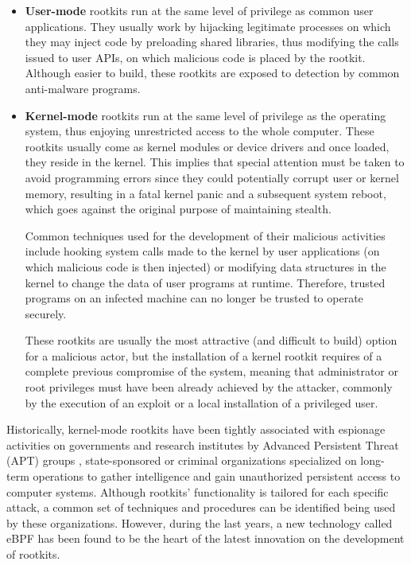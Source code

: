 \begin{itemize}
\item \textbf{User-mode} rootkits run at the same level of privilege as common user applications. They usually work by hijacking legitimate processes on which they may inject code by preloading shared libraries, thus modifying the calls issued to user APIs, on which malicious code is placed by the rootkit. Although easier to build, these rootkits are exposed to detection by common anti-malware programs.
\item \textbf{Kernel-mode} rootkits run at the same level of privilege as the operating system, thus enjoying unrestricted access to the whole computer. These rootkits usually come as kernel modules or device drivers and once loaded, they reside in the kernel. This implies that special attention must be taken to avoid programming errors since they could potentially corrupt user or kernel memory, resulting in a fatal kernel panic and a subsequent system reboot, which goes against the original purpose of maintaining stealth.

Common techniques used for the development of their malicious activities include hooking system calls made to the kernel by user applications (on which malicious code is then injected) or modifying data structures in the kernel to change the data of user programs at runtime. Therefore, trusted programs on an infected machine can no longer be trusted to operate securely.

These rootkits are usually the most attractive (and difficult to build) option for a malicious actor, but the installation of a kernel rootkit requires of a complete previous compromise of the system, meaning that administrator or root privileges must have been already achieved by the attacker, commonly by the execution of an exploit or a local installation of a privileged user.
\end{itemize}

Historically, kernel-mode rootkits have been tightly associated with espionage activities on governments and research institutes by Advanced Persistent Threat (APT) groups \cite{rootkit_ptsecurity}, state-sponsored or criminal organizations specialized on long-term operations to gather intelligence and gain unauthorized persistent access to computer systems. Although rootkits' functionality is tailored for each specific attack, a common set of techniques and procedures can be identified being used by these organizations. However, during the last years, a new technology called eBPF has been found to be the heart of the latest innovation on the development of rootkits. 

